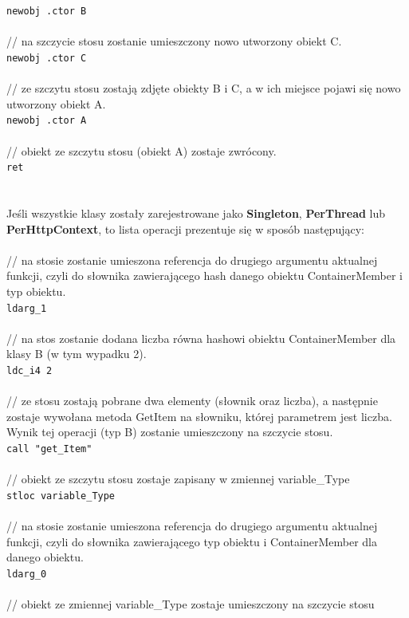 \documentclass[12pt]{article}
\begin{document}
\texttt{newobj .ctor B}\\
\\ 
// na szczycie stosu zostanie umieszczony nowo utworzony obiekt C.\\
\texttt{newobj .ctor C}\\
\\
// ze szczytu stosu zostają zdjęte obiekty B i C, a w ich miejsce pojawi się nowo utworzony obiekt A.\\
\texttt{newobj .ctor A}\\
\\
// obiekt ze szczytu stosu (obiekt A) zostaje zwrócony.\\
\texttt{ret}\\
\\
\\
Jeśli wszystkie klasy zostały zarejestrowane jako \textbf{Singleton}, \textbf{PerThread} lub \textbf{PerHttpContext}, to lista operacji prezentuje się w sposób następujący:\\
\\
// na stosie zostanie umieszona referencja do drugiego argumentu aktualnej funkcji, czyli do słownika zawierającego hash danego obiektu ContainerMember i typ obiektu.\\
\texttt{ldarg\_1}\\
\\
// na stos zostanie dodana liczba równa hashowi obiektu ContainerMember dla klasy B (w tym wypadku 2).\\
\texttt{ldc\_i4 2}\\
\\
// ze stosu zostają pobrane dwa elementy (słownik oraz liczba), a następnie zostaje wywołana metoda GetItem na słowniku, której parametrem jest liczba. Wynik tej operacji (typ B) zostanie umieszczony na szczycie stosu.\\
\texttt{call "get\_Item"}\\
\\
// obiekt ze szczytu stosu zostaje zapisany w zmiennej variable\_Type\\
\texttt{stloc variable\_Type}\\
\\
// na stosie zostanie umieszona referencja do drugiego argumentu aktualnej funkcji, czyli do słownika zawierającego typ obiektu i ContainerMember dla danego obiektu.\\
\texttt{ldarg\_0}\\
\\
// obiekt ze zmiennej variable\_Type zostaje umieszczony na szczycie stosu\\
\end{document}
